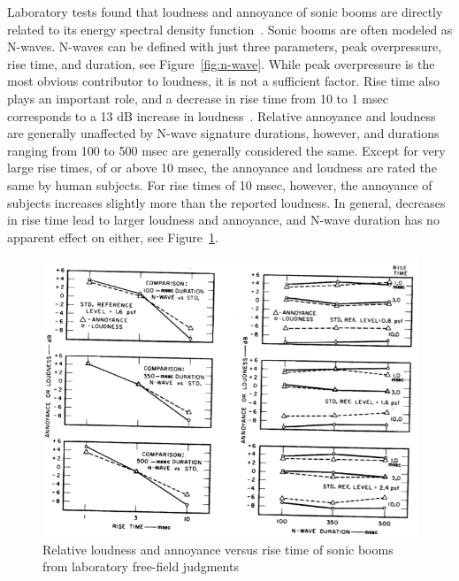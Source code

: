 \documentclass[]{aiaa-tc}%
\begin{document}
Laboratory tests found that loudness and annoyance of sonic booms are directly related to its energy spectral density function~\cite{johnson1969procedure}. Sonic booms are often modeled as N-waves. N-waves can be defined with just three parameters, peak overpressure, rise time, and duration, see Figure~\ref{fig:n-wave}. While peak overpressure is the most obvious contributor to loudness, it is not a sufficient factor. Rise time also plays an important role, and a decrease in rise time from 10 to 1 msec corresponds to a 13 dB increase in loudness~\cite{von1972human}. Relative annoyance and loudness are generally unaffected by N-wave signature durations, however, and durations ranging from 100 to 500 msec are generally considered the same. Except for very large rise times, of or above 10 msec, the annoyance and loudness are rated the same by human subjects. For rise times of 10 msec, however, the annoyance of subjects increases slightly more than the reported loudness. In general, decreases in rise time lead to larger loudness and annoyance, and N-wave duration has no apparent effect on either, see Figure~\ref{fig:n-wave-effects}.

\begin{figure}[tb!]
  \centering
  \includegraphics[width=\textwidth]{figs/n-wave-effects.png}
  \caption{Relative loudness and annoyance versus rise time of sonic booms from laboratory free-field judgments~\cite{von1972human}}
  \label{fig:n-wave-effects}
\end{figure}
\end{document}
